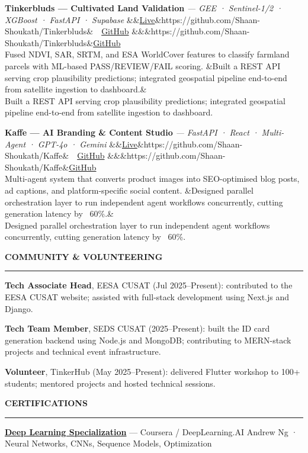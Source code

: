 \documentclass[10.8pt, a4paper]{article}
\newcommand{\cvsection}[1]{%
  \vspace{7pt}%
  {\color{accent}\textbf{\MakeUppercase{#1}}}\\[-5pt]
  {\color{rulecol}\rule{\linewidth}{0.5pt}}%
  \vspace{2pt}%
}
\newcommand{\project}[6]{%
  \textbf{#1} {\small\color{subtle}\textit{— #2}}%
  \ifx&#6&\else\hfill{\small\href{#6}{\textcolor{accent}{Live}}\ifx&#5&\else\ \textbar\ \href{#5}{\textcolor{accent}{GitHub}}\fi}\fi%
  \ifx&#6&\ifx&#5&\else\hfill{\small\href{#5}{\textcolor{accent}{GitHub}}}\fi\fi\\
  {\small #3}%
  \ifx&#4&\else\\ {\small #4}\fi%
}
\begin{document}
\vspace{4pt}
\project{Tinkerbluds — Cultivated Land Validation}{GEE · Sentinel-1/2 · XGBoost · FastAPI · Supabase}%
        {Fused NDVI, SAR, SRTM, and ESA WorldCover features to classify farmland parcels with ML-based PASS/REVIEW/FAIL scoring.}%
        {Built a REST API serving crop plausibility predictions; integrated geospatial pipeline end-to-end from satellite ingestion to dashboard.}%
        {https://github.com/Shaan-Shoukath/Tinkerbluds}{}

\vspace{4pt}
\project{Kaffe — AI Branding \& Content Studio}{FastAPI · React · Multi-Agent · GPT-4o · Gemini}%
        {Multi-agent system that converts product images into SEO-optimised blog posts, ad captions, and platform-specific social content.}%
        {Designed parallel orchestration layer to run independent agent workflows concurrently, cutting generation latency by ~60\%.}%
        {https://github.com/Shaan-Shoukath/Kaffe}{}

\cvsection{Community \& Volunteering}
{\small\textbf{Tech Associate Head}, EESA CUSAT (Jul 2025–Present): contributed to the EESA CUSAT website; assisted with full-stack development using Next.js and Django.}

\vspace{4pt}
{\small\textbf{Tech Team Member}, SEDS CUSAT (2025–Present): built the ID card generation backend using Node.js and MongoDB; contributing to MERN-stack projects and technical event infrastructure.}

\vspace{4pt}
{\small\textbf{Volunteer}, TinkerHub (May 2025–Present): delivered Flutter workshop to 100+ students; mentored projects and hosted technical sessions.}

\cvsection{Certifications}
{\small\href{https://www.coursera.org/account/accomplishments/specialization/D2GSDEZHMNFZ?utm_source%3Dandroid%26utm_medium%3Dcertificate%26utm_content%3Dcert_image%26utm_campaign%3Dsharing_cta%26utm_product%3Ds12n}{\textbf{Deep Learning Specialization}} — Coursera / DeepLearning.AI \hfill {\color{subtle}Andrew Ng · Neural Networks, CNNs, Sequence Models, Optimization}}
\end{document}
